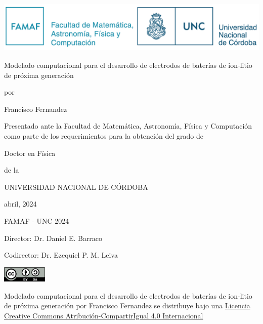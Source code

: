 \thispagestyle{empty}
\begin{center}
{\large
    \includegraphics[height=2.5cm]{Caratula/logo.png}

    \vspace{1cm}

    {\Huge Modelado computacional para el desarrollo de electrodos de baterías de ion-litio de próxima generación}
    
    \vspace{0.5cm}
    por
    \vspace{0.5cm}
    
    {\Large Francisco Fernandez}

    \vspace{0.5cm}

    Presentado ante la Facultad de Matemática, Astronomía, Física y Computación 
    como parte de los requerimientos para la obtención del grado de
    
    \vspace{0.5cm}

    {\Large Doctor en Física}

    \vspace{0.5cm}
    de la

    UNIVERSIDAD NACIONAL DE CÓRDOBA

    \vspace{0.5cm}
    
    abril, 2024

    \textcopyright FAMAF - UNC 2024

    \vspace{1.5cm}

    Director: Dr. Daniel E. Barraco 

    Codirector: Dr. Ezequiel P. M. Leiva

    \vspace{1.5cm}
    \href{https://creativecommons.org/licenses/by-sa/4.0/deed.es}{
        \includegraphics[height=0.75cm]{Caratula/cc-by-sa.png}
    }

    {\footnotesize 
    Modelado computacional para el desarrollo de electrodos de baterías de 
    ion-litio de próxima generación por Francisco Fernandez se distribuye bajo una 
    \href{https://creativecommons.org/licenses/by-sa/4.0/deed.es}{Licencia 
    Creative Commons Atribución-CompartirIgual 4.0 Internacional}
    }
}
\end{center}
